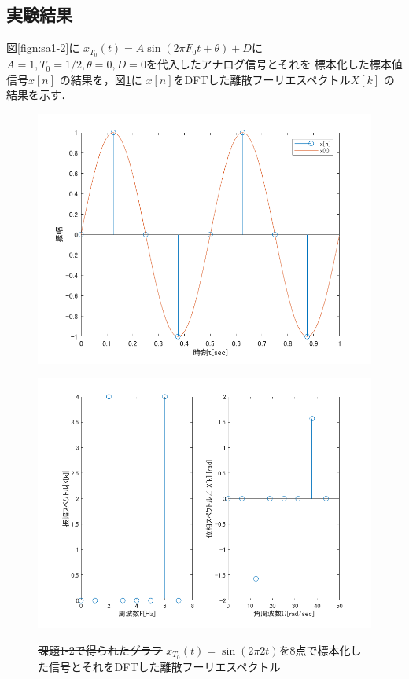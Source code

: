 \documentclass[11pt, a4paper, titlepage]{ltjsarticle}
\begin{document}
\subsection*{実験結果}
図\ref*{fign:sa1-2}に
$x_{T_{0}}(t)=A\sin(2\pi F_{0}t+\theta)+ D$に
$A=1,T_{0}=1/2,\theta=0,D=0$を代入したアナログ信号とそれを
標本化した標本値信号$x[n]$
の結果を，図\ref*{fign:sp1-2}に
$x[n]$をDFTした離散フーリエスペクトル$X[k]$
の結果を示す．
\begin{figure}[h]
\begin{center}
\begin{minipage}[t]{0.48\columnwidth}
    \includegraphics[width=\columnwidth]{figures/sampling1-2.png}
    \label{fign:sa1-2}
\end{minipage}
\begin{minipage}[t]{0.48\columnwidth}
    \includegraphics[width=\columnwidth]{figures/spectrum1-2.png}
    \label{fign:sp1-2}
\end{minipage}
\end{center}
\caption{\sout{課題1-2で得られたグラフ}
$x_{T_{0}}(t)=\sin(2\pi 2t)$を8点で標本化した信号とそれをDFTした離散フーリエスペクトル}
\end{figure}
\end{document}
